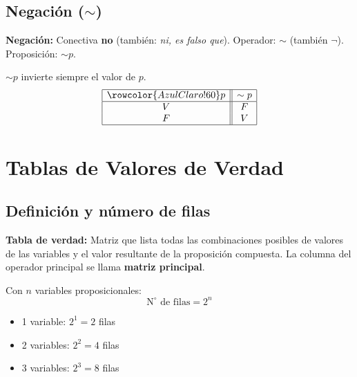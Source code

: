 	\subsection{Negación ($\sim$)}
	
	\begin{cajadef}
		\textbf{Negación:} Conectiva \textbf{no} (también: \textit{ni, es falso que}).
		Operador: $\sim$ (también $\neg$). Proposición: $\sim p$.
	\end{cajadef}
	
	\begin{cajaprop}[Negación]
		$\sim p$ invierte siempre el valor de $p$.
		\[
		\begin{array}{|c||c|}
			\hline
			\rowcolor{AzulClaro!60}
			p & \sim p \\
			\hline
			V & F \\
			F & V \\
			\hline
		\end{array}
		\]
	\end{cajaprop}
	
	\section{Tablas de Valores de Verdad}
	
	\subsection{Definición y número de filas}
	
	\begin{cajadef}
		\textbf{Tabla de verdad:} Matriz que lista todas las combinaciones posibles
		de valores de las variables y el valor resultante de la proposición compuesta.
		La columna del operador principal se llama \textbf{matriz principal}.
	\end{cajadef}
	
	\begin{cajaprop}
		Con $n$ variables proposicionales:
		\[
		\text{N}^{\circ}\text{ de filas} = 2^{n}
		\]
		\vspace{-6pt}
		\begin{itemize}
			\item 1 variable: $2^1 = 2$ filas
			\item 2 variables: $2^2 = 4$ filas
			\item 3 variables: $2^3 = 8$ filas
		\end{itemize}
	\end{cajaprop}
	
